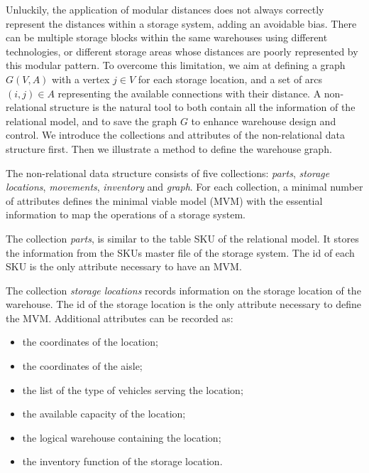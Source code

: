 Unluckily, the application of modular distances does not always correctly represent the distances within a storage system, adding an avoidable bias. There can be multiple storage blocks within the same warehouses using different technologies, or different storage areas whose distances are poorly represented by this modular pattern. To overcome this limitation, we aim at defining a graph $G(V,A)$ with a vertex $j\in V$ for each  storage location, and a set of arcs $\left(i,j\right)\in A$ representing the available connections with their distance. A non-relational structure is the natural tool to both contain all the information of the relational model, and to save the graph $G$ to enhance warehouse design and control. We introduce the collections and attributes of the non-relational data structure first. Then we illustrate a method to define the warehouse graph. \par

The non-relational data structure consists of five collections: \textit{parts}, \textit{storage locations}, \textit{movements}, \textit{inventory} and \textit{graph}. For each collection, a minimal number of attributes defines the minimal viable model (MVM) with the essential information to map the operations of a storage system. \par

The collection \textit{parts}, is similar to the table SKU of the relational model. It stores the information from the SKUs master file of the storage system. The id of each SKU is the only attribute necessary to have an MVM. \par

The collection \textit{storage locations} records information on the storage location of the warehouse. The id of the storage location is the only attribute necessary to define the MVM. Additional attributes can be recorded as:

\begin{itemize}
    \item the coordinates of the location; 
    \item the coordinates of the aisle; 
    \item the list of the type of vehicles serving the location; 
    \item the available capacity of the location; 
    \item the logical warehouse containing the location;
    \item the inventory function of the storage location.
\end{itemize}

